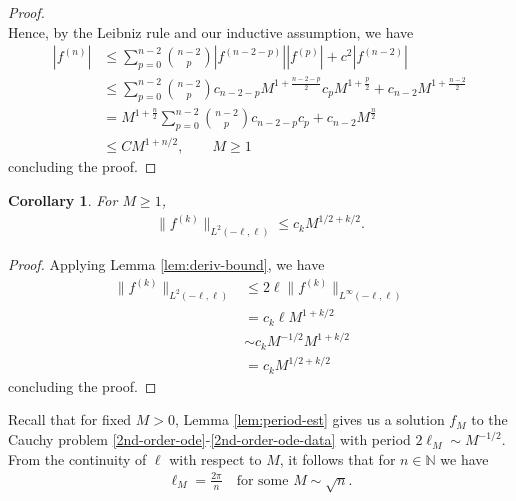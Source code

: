 \documentclass[12pt,reqno]{amsart}
\numberwithin{equation}{section}  %
\newtheorem{corollary}[theorem]{Corollary}
\begin{document}
\begin{proof}
\begin{equation*}
\end{equation*}
%
%
Hence, by the Leibniz rule and our inductive assumption, we have
%
%
\begin{equation*}
\begin{split}
  | f^{(n)} |
  & \le  \sum_{p=0}^{n-2} \binom{n-2}{p} | f^{(n-2-p)} | |
  f^{(p)} | + c^{2} | f^{(n-2)} |
  \\
  & \le  \sum_{p=0}^{n-2} \binom{n-2}{p} c_{n-2-p}M^{1 +
  \frac{n-2-p}{2}}c_{p}M^{1 + \frac{p}{2}} + c_{n-2} M^{1 + \frac{n-2}{2}}
  \\
  & = M^{1 + \frac{n}{2}} \sum_{p=0}^{n-2} \binom{n-2}{p} c_{n-2-p}c_{p}
  + c_{n-2} M^{\frac{n}{2}}
  \\
  & \le C M^{1 + n/2}, \qquad M \ge 1
\end{split}
\end{equation*}
%
%
concluding the proof.
\end{proof}
%
%
%
%
%
%                
%
%
%
%
\begin{corollary}
For $M \ge 1$,
%
%
\begin{equation*}
\begin{split}
  \| f^{(k)} \|_{L^{2}(-\ell, \ell)} \le c_{k} M^{1/2 + k/2}.
\end{split}
\end{equation*}
%
%
\label{cor:sob-norm-bound}
\end{corollary}
%
%
%
%
\begin{proof}
  Applying Lemma \ref{lem:deriv-bound}, we have
  \begin{equation*}
  \begin{split}
    \| f^{(k)} \|_{L^{2}(-\ell, \ell)}
    & \le 2 \ell \| f^{(k)} \|_{L^{\infty}(-\ell, \ell)}
    \\
    & =  c_{k} \ell M^{1 + k/2}
    \\
    & \sim c_{k} M^{-1/2} M^{1 + k/2}
    \\
    & = c_{k} M^{1/2 + k/2}
  \end{split}
  \end{equation*}
  concluding the proof.
\end{proof}
%
%
Recall that for fixed $M > 0$, Lemma \ref{lem:period-est} gives us a
solution $f_{M}$ to the Cauchy problem
\eqref{2nd-order-ode}-\eqref{2nd-order-ode-data} with period $2 \ell_{M} \sim
M^{-1/2}$. From the continuity of $\ell$ with respect to $M$, it follows that for $n \in \mathbb{N}$ we have 
%
%
\begin{equation*}
\begin{split}
  \ell_{M} = \frac{2\pi}{n} \quad \text{for some } M \sim \sqrt{n}.
\end{split}
\end{equation*}
\end{document}
